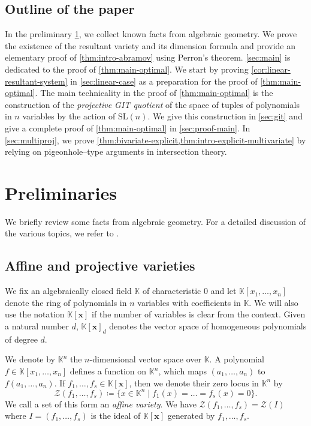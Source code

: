 \documentclass[11pt,a4paper]{article}
\numberwithin{equation}{section}
\newcommand{\KK}{\mathbb{K}}
\newcommand{\cZ}{\mathcal{Z}}
\newcommand{\xx}{\ensuremath{\boldsymbol{x}}}
\newcommand{\SL}{\mathrm{SL}}
\begin{document}
\subsection{Outline of the paper}
In the preliminary \cref{sec:prelims}, we collect known facts from algebraic geometry.
We prove the existence of the resultant variety and its dimension formula and provide an elementary proof of \cref{thm:intro-abramov} using Perron's theorem.
\cref{sec:main} is dedicated to the proof of \cref{thm:main-optimal}.
We start by proving \cref{cor:linear-resultant-system} in \cref{sec:linear-case} as a preparation for the proof of \cref{thm:main-optimal}.
The main technicality in the proof of \cref{thm:main-optimal} is the construction of the \emph{projective GIT quotient} of the space of tuples of polynomials in $n$ variables by the action of $\SL(n)$.
We give this construction in \cref{sec:git} and give a complete proof of \cref{thm:main-optimal} in \cref{sec:proof-main}.
In \cref{sec:multiproj}, we prove \cref{thm:bivariate-explicit,thm:intro-explicit-multivariate} by relying on pigeonhole--type arguments in intersection theory.

\section{Preliminaries}
\label{sec:prelims}
We briefly review some facts from algebraic geometry.
For a detailed discussion of the various topics, we refer to \cite{Harris-93,Shafarevich-13}. 
\subsection{Affine and projective varieties}
\label{sec:varieties}

We fix an algebraically closed field $\KK$ of characteristic $0$ and let
$\KK[x_1,\dots,x_n]$ denote the ring of polynomials in $n$ variables with coefficients in $\KK$. 
We will also use the notation $\KK[\xx]$ if the number of variables is clear from the context.
Given a natural number $d$, $\KK[\xx]_d$ denotes the vector space of homogeneous polynomials of degree $d$.

We denote by $\KK^n$ the $n$-dimensional vector space over $\KK$.
A polynomial $f\in\KK[x_1,\dots,x_n]$ defines a function on $\KK^n$, which maps $(a_1,\dots,a_n)$ to $f(a_1,\dots,a_n)$.
If $f_1,\dots,f_s\in\KK[\xx]$, then we denote 
their zero locus in $\KK^n$ by
  \[
\cZ(f_1,\dots,f_s) \coloneqq \{x\in\KK^n\mid f_1(x)=\dots=f_s(x)=0\} .
\] 
We call a set of this form an \emph{affine variety}.
We have $\cZ(f_1,\dots,f_s)=\cZ(I)$ where $I=(f_1,\dots,f_s)$ is the ideal of $\KK[\xx]$ generated by $f_1,\dots,f_s$.
\end{document}
